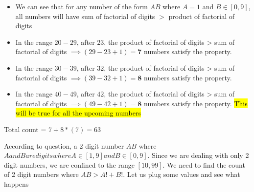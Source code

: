 \begin{itemize}
    \item We can see that for any number of the form $AB$ where $A=1$ and $B \in [0,9]$, all numbers will have sum of factorial of digits $ > $ product of factorial of digits

    \item In the range $20 - 29$, after $23$, the product of factorial of digits > sum of factorial of digits $\implies (29 - 23 + 1) = \textbf{7}$ numbers satisfy the property. 
    
    \item In the range $30 - 39$, after $32$, the product of factorial of digits > sum of factorial of digits $\implies (39 - 32 + 1) = \textbf{8}$ numbers satisfy the property.  

    \item In the range $40 - 49$, after $42$, the product of factorial of digits > sum of factorial of digits $\implies (49 - 42 + 1) = \textbf{8}$ numbers satisfy the property. \hl{This will be true for all the upcoming numbers}  
\end{itemize}

Total count = $7 + 8 * (7) = 63$

\vspace{2cm}


According to question, a 2 digit number $AB$ where $A and B are digits where A \in [1,9] and B \in [0,9]$. Since we are dealing with only 2 digit numbers, we are confined to the range $[10,99]$. We need to find the count of 2 digit numbers where $AB > A! + B!$. Let us plug some values and see what happens

